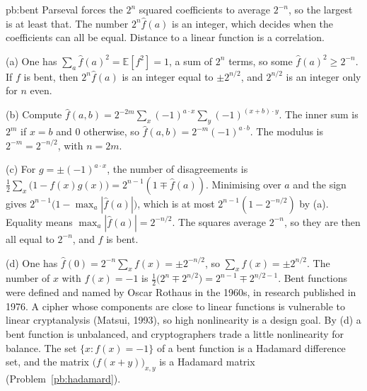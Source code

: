 \begin{solution}{pb:bent}
\idea Parseval forces the $2^n$ squared coefficients to average $2^{-n}$, so the largest is at least that. The number $2^n\hat f(a)$ is an integer, which decides when the coefficients can all be equal. Distance to a linear function is a correlation.

\writeup (a) One has $\sum_a\hat f(a)^2=\mathbb E[f^2]=1$, a sum of $2^n$ terms, so some $\hat f(a)^2\ge2^{-n}$. If $f$ is bent, then $2^n\hat f(a)$ is an integer equal to $\pm2^{n/2}$, and $2^{n/2}$ is an integer only for $n$ even.

(b) Compute $\hat f(a,b)=2^{-2m}\sum_x(-1)^{a\cdot x}\sum_y(-1)^{(x+b)\cdot y}$. The inner sum is $2^m$ if $x=b$ and $0$ otherwise, so $\hat f(a,b)=2^{-m}(-1)^{a\cdot b}$. The modulus is $2^{-m}=2^{-n/2}$, with $n=2m$.

(c) For $g=\pm(-1)^{a\cdot x}$, the number of disagreements is $\frac12\sum_x\bigl(1-f(x)g(x)\bigr)=2^{n-1}(1\mp\hat f(a))$. Minimising over $a$ and the sign gives $2^{n-1}\bigl(1-\max_a|\hat f(a)|\bigr)$, which is at most $2^{n-1}(1-2^{-n/2})$ by (a). Equality means $\max_a|\hat f(a)|=2^{-n/2}$. The squares average $2^{-n}$, so they are then all equal to $2^{-n}$, and $f$ is bent.

(d) One has $\hat f(0)=2^{-n}\sum_x f(x)=\pm2^{-n/2}$, so $\sum_x f(x)=\pm2^{n/2}$. The number of $x$ with $f(x)=-1$ is $\frac12\bigl(2^n\mp2^{n/2}\bigr)=2^{n-1}\mp2^{n/2-1}$.
\leads Bent functions were defined and named by Oscar Rothaus in the 1960s, in research published in 1976. A cipher whose components are close to linear functions is vulnerable to linear cryptanalysis (Matsui, 1993), so high nonlinearity is a design goal. By (d) a bent function is unbalanced, and cryptographers trade a little nonlinearity for balance. The set $\{x:f(x)=-1\}$ of a bent function is a Hadamard difference set, and the matrix $\bigl(f(x+y)\bigr)_{x,y}$ is a Hadamard matrix (Problem~\ref{pb:hadamard}).
\end{solution}

